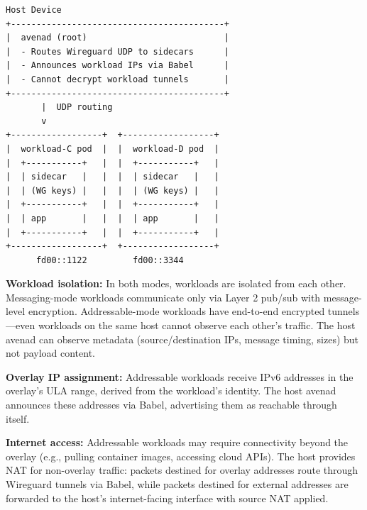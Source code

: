 \begin{Verbatim}[frame=single,fontsize=\small]
Host Device
+------------------------------------------+
|  avenad (root)                           |
|  - Routes Wireguard UDP to sidecars      |
|  - Announces workload IPs via Babel      |
|  - Cannot decrypt workload tunnels       |
+------------------------------------------+
       |  UDP routing
       v
+------------------+  +------------------+
|  workload-C pod  |  |  workload-D pod  |
|  +-----------+   |  |  +-----------+   |
|  | sidecar   |   |  |  | sidecar   |   |
|  | (WG keys) |   |  |  | (WG keys) |   |
|  +-----------+   |  |  +-----------+   |
|  | app       |   |  |  | app       |   |
|  +-----------+   |  |  +-----------+   |
+------------------+  +------------------+
      fd00::1122         fd00::3344
\end{Verbatim}

\textbf{Workload isolation:} In both modes, workloads are isolated from each other. Messaging-mode workloads communicate only via Layer 2 pub/sub with message-level encryption. Addressable-mode workloads have end-to-end encrypted tunnels---even workloads on the same host cannot observe each other's traffic. The host avenad can observe metadata (source/destination IPs, message timing, sizes) but not payload content.

\textbf{Overlay IP assignment:} Addressable workloads receive IPv6 addresses in the overlay's ULA range, derived from the workload's identity. The host avenad announces these addresses via Babel, advertising them as reachable through itself.

\textbf{Internet access:} Addressable workloads may require connectivity beyond the overlay (e.g., pulling container images, accessing cloud APIs). The host provides NAT for non-overlay traffic: packets destined for overlay addresses route through Wireguard tunnels via Babel, while packets destined for external addresses are forwarded to the host's internet-facing interface with source NAT applied.
